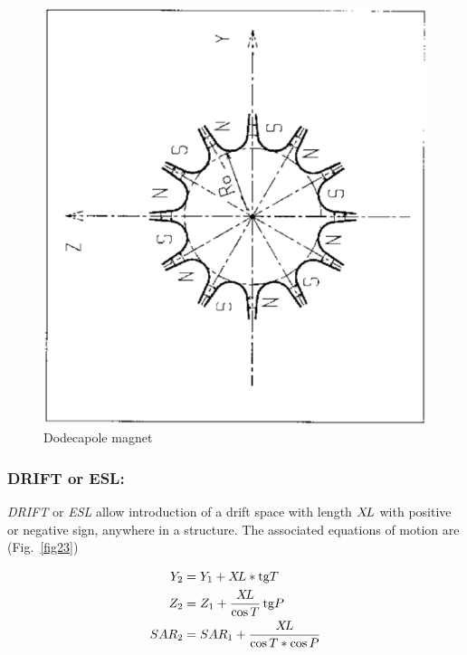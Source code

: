 \begin{figure}[H]
\centerline{\includegraphics[width=12cm,angle=-90]{Fig19.ps}}
\caption{\label{fig19}Dodecapole magnet}
\end{figure}
\vfill

\newpage
\subsubsection*{DRIFT or ESL: \DRIFTTitl}\label{ESL}\label{DRIFT}
\medskip

\textsl{DRIFT} or \textsl{ESL} allow introduction of a drift space with length $ X\!L $ with 
positive or negative sign, anywhere in a structure.  The associated equations 
of motion are (Fig.~\ref{fig23})   

\begin{align*}
	Y_2 &   =    Y_1+X\!L \ast \text{tg} T  \\ 
	Z_2 &   =   Z_1 + \dfrac{X\!L}{\cos  T}\,  \text{tg} P  \\
	SAR_2 &   =  SAR_1+ \dfrac{X\!L }{\cos  T  \ast \cos  P}  
\end{align*}
\vfill

